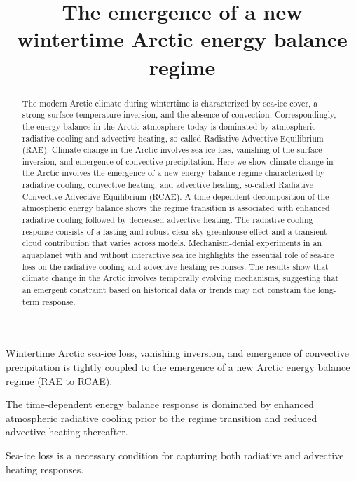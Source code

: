 \documentclass[draft]{agujournal2019}
\begin{document}
\title{The emergence of a new wintertime Arctic energy balance regime}





\begin{keypoints}
\item Wintertime Arctic sea-ice loss, vanishing inversion, and emergence of convective precipitation is tightly coupled to the emergence of a new Arctic energy balance regime (RAE to RCAE).
\item The time-dependent energy balance response is dominated by enhanced atmospheric radiative cooling prior to the regime transition and reduced advective heating thereafter.
\item Sea-ice loss is a necessary condition for capturing both radiative and advective heating responses.
\end{keypoints}

\begin{abstract}
The modern Arctic climate during wintertime is characterized by sea-ice cover, a strong surface temperature inversion, and the absence of convection. Correspondingly, the energy balance in the Arctic atmosphere today is dominated by atmospheric radiative cooling and advective heating, so-called Radiative Advective Equilibrium (RAE). Climate change in the Arctic involves sea-ice loss, vanishing of the surface inversion, and emergence of convective precipitation. Here we show climate change in the Arctic involves the emergence of a new energy balance regime characterized by radiative cooling, convective heating, and advective heating, so-called Radiative Convective Advective Equilibrium (RCAE). A time-dependent decomposition of the atmospheric energy balance shows the regime transition is associated with enhanced radiative cooling followed by decreased advective heating. The radiative cooling response consists of a lasting and robust clear-sky greenhouse effect and a transient cloud contribution that varies across models. Mechanism-denial experiments in an aquaplanet with and without interactive sea ice highlights the essential role of sea-ice loss on the radiative cooling and advective heating responses. The results show that climate change in the Arctic involves temporally evolving mechanisms, suggesting that an emergent constraint based on historical data or trends may not constrain the long-term response.
\end{abstract}
\end{document}
